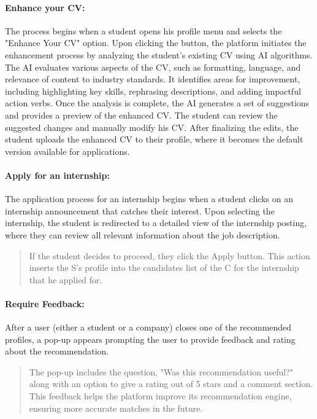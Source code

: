 \paragraph{Enhance your CV:} The process begins when a student opens his
  profile menu and selects the "Enhance Your CV" option. Upon clicking
  the button, the platform initiates the enhancement process by
  analyzing the student's existing CV using AI algorithms. The AI
  evaluates various aspects of the CV, such as formatting, language, and
  relevance of content to industry standards. It identifies areas for
  improvement, including highlighting key skills, rephrasing
  descriptions, and adding impactful action verbs. Once the analysis is
  complete, the AI generates a set of suggestions and provides a preview
  of the enhanced CV. The student can review the suggested changes and
  manually modify his CV. After finalizing the edits, the student
  uploads the enhanced CV to their profile, where it becomes the default
  version available for applications.

\paragraph{Apply for an internship:} The application process for an
  internship begins when a student clicks on an internship announcement
  that catches their interest. Upon selecting the internship, the
  student is redirected to a detailed view of the internship posting,
  where they can review all relevant information about the job
  description.

\begin{quote}
If the student decides to proceed, they click the
\textquotesingle Apply\textquotesingle{} button. This action inserts the
S's profile into the candidates list of the C for the internship that he
applied for.~
\end{quote}

\paragraph{Require Feedback:} After a user (either a student or a
  company) closes one of the recommended profiles, a pop-up appears
  prompting the user to provide feedback and rating about the
  recommendation.

\begin{quote}
The pop-up includes the question, "Was this recommendation useful?"
along with an option to give a rating out of 5 stars and a comment
section. This feedback helps the platform improve its recommendation
engine, ensuring more accurate matches in the future.
\end{quote}

